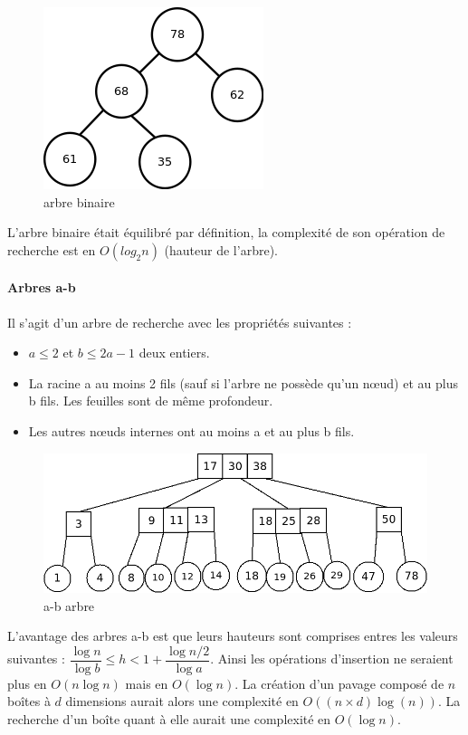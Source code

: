 \begin{figure}[htbp]
  \centering
  \includegraphics[scale=0.60]{img/binTree}
  \caption{arbre binaire}
  \label{fig:abtree}
\end{figure}
L'arbre binaire était équilibré par définition, la complexité de son opération de recherche est en $O(log_2 n)$ (hauteur de l'arbre).
   


\clearpage
\paragraph{Arbres a-b}
Il s'agit d'un arbre de recherche avec les propriétés suivantes :
\begin{itemize}
\item
  $a\leq2$ et $b\leq 2a−1$ deux entiers.
\item
  La racine a au moins 2 fils (sauf si l'arbre ne possède qu'un nœud) et au plus b fils.
  Les feuilles sont de même profondeur.
\item
  Les autres nœuds internes ont au moins a et au plus b fils.
\end{itemize}

\begin{figure}[htbp]
  \centering
  \includegraphics[scale=0.40]{img/abtree}
  \caption{a-b arbre}
  \label{fig:abtree}
\end{figure}

L'avantage des arbres a-b est que leurs hauteurs  sont comprises entres les valeurs suivantes : $ \dfrac{\log{n}}{\log{b}}   \leq h  < 1 + \dfrac{\log{n/2}}{\log{a}}$. Ainsi les opérations d'insertion ne seraient plus en $O(n\log{n})$ mais en $O(\log{n})$. La création d'un pavage composé de $n$ boîtes à $d$ dimensions aurait alors une complexité en $O((n\times d)\log(n))$. La recherche d'un boîte quant à elle aurait une complexité en $O(\log{n})$.




